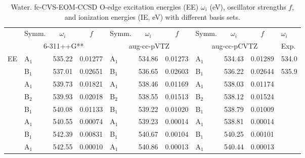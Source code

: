 \documentclass[journal=jctcce,manuscript=article]{achemso}
\begin{document}
\begin{table}[H]
\caption{Water. fc-CVS-EOM-CCSD O-edge excitation energies (EE) $\omega_i$ (eV), oscillator strengths $f$, and ionization energies (IE, eV) with different basis sets.
\label{Tab:Water}
}
\scriptsize
\begin{tabular}{l|lcc|lcc|lcc|l}
\cline{2-11}
& Symm. & $\omega_i$ & $f$ 
& Symm. & $\omega_i$ & $f$ 
& Symm. & $\omega_i$ & $f$
& $\omega_i$ \\
\cline{2-11}
      & \multicolumn{3}{c|}{6-311++G**}
      & \multicolumn{3}{c|}{aug-cc-pVTZ}
      & \multicolumn{3}{c|}{aug-cc-pCVTZ}
      & Exp.\cite{NEXAFS_H2O_NH3_CH4_Exp} \\
\hline
  EE 
& A$_1$ & 535.22 & 0.01277 & A$_1$ & 534.86 & 0.01273 & A$_1$ & 534.43 & 0.01289 & 534.0\cite{NEXAFS_H2O_NH3_CH4_Exp} \\
& B$_1$ & 537.01 & 0.02651 & B$_1$ & 536.65 & 0.02603 & B$_1$ & 536.22 & 0.02644 & 535.9\cite{NEXAFS_H2O_NH3_CH4_Exp} \\
& A$_1$ & 539.73 & 0.01821 & A$_1$ & 538.46 & 0.01169 & A$_1$ & 538.03 & 0.01174 \\
& B$_2$ & 539.93 & 0.02018 & B$_2$ & 538.55 & 0.01513 & B$_2$ & 538.12 & 0.01524 \\
& B$_1$ & 540.08 & 0.01133 & B$_1$ & 539.22 & 0.01020 & B$_1$ & 538.79 & 0.01009 \\
& A$_1$ & 540.55 & 0.00074 & A$_1$ & 539.23 & 0.00014 & A$_1$ & 538.81 & 0.00014 \\
& B$_1$ & 542.39 & 0.00831 & B$_1$ & 540.67 & 0.00104 & B$_1$ & 540.25 & 0.00101 \\
& A$_1$ & 542.55 & 0.00010 & A$_1$ & 540.86 & 0.00013 & A$_1$ & 540.44 & 0.00013 \\


\end{tabular}
\end{table}
\end{document}
